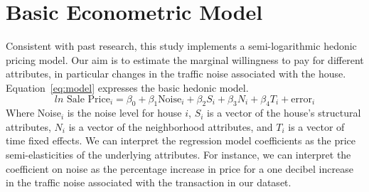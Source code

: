\documentclass{article}\usepackage{graphicx, color}
\begin{document}
\section{Basic Econometric Model}\label{basicModel}
Consistent with past research, this study implements a semi-logarithmic hedonic pricing model. Our aim is to estimate the marginal willingness to pay for different attributes, in particular changes in the traffic noise associated with the house. Equation~\eqref{eq:model} expresses the basic hedonic model.
\begin{equation}\label{eq:model}	
ln \textrm{ Sale Price}_i = \beta _0 + \beta _1 \textrm{Noise}_i+ \beta _2 S_i+ \beta _3 N_i + \beta _4 T_i + \textrm{error}_i
\end{equation}
Where Noise$_i$ is the noise level for house $i$, $S_i$ is a vector of the house's structural attributes, $N_i$ is a vector of the neighborhood attributes, and $T_i$ is a vector of time fixed effects. We can interpret the regression model coefficients as the price semi-elasticities of the underlying attributes. For instance, we can interpret the coefficient on noise as the percentage increase in price for a one decibel increase in the traffic noise associated with the transaction in our dataset. 
\end{document}
